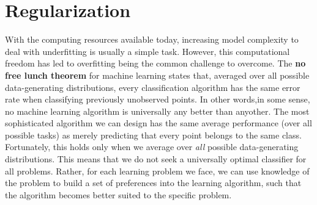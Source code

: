 
\section{Regularization}\label{section:regularization}
With the computing resources available today, increasing model complexity to deal 
with underfitting is usually a simple task. However, this computational freedom 
has led to overfitting being the common challenge to overcome. 
The \textbf{no free lunch theorem} for machine learning \cite{Wolpert1997} states
that, averaged over all possible data-generating distributions, every classification
algorithm has the same error rate when classifying previously unobserved points.
In other words,in some sense, no machine learning algorithm is universally any better 
than anyother. The most sophisticated algorithm we can design has the same average
performance (over all possible tasks) as merely predicting that every point belongs
to the same class. Fortunately, this holds only when we average over \textit{all}
possible data-generating distributions\cite{Goodfellow-et-al-2016}. 
This means that we do not seek a universally optimal classifier for all problems.
Rather, for each learning problem we face, we can use knowledge of the problem to 
build a set of preferences into the learning algorithm, such that the algorithm 
becomes better suited to the specific problem.

